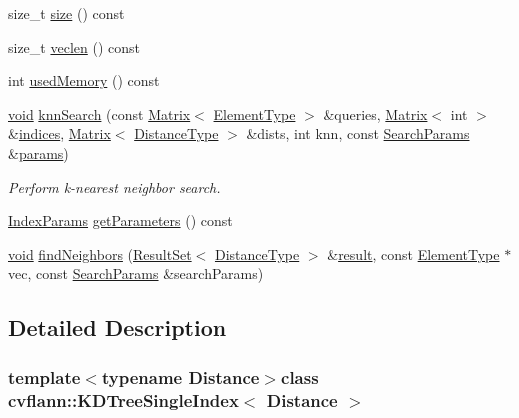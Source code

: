 \begin{DoxyCompactItemize}
size\-\_\-t \hyperlink{classcvflann_1_1KDTreeSingleIndex_af9db9baa7fc203e002f1e0e5c7f4e3de}{size} () const 
\item 
size\-\_\-t \hyperlink{classcvflann_1_1KDTreeSingleIndex_a4f9c5a8847c6b86b715606635669098e}{veclen} () const 
\item 
int \hyperlink{classcvflann_1_1KDTreeSingleIndex_adb37afd1fc827ca1ad640abec4396a75}{used\-Memory} () const 
\item 
\hyperlink{legacy_8hpp_a8bb47f092d473522721002c86c13b94e}{void} \hyperlink{classcvflann_1_1KDTreeSingleIndex_a5f53f54a2b04a25a370cb7f03a5317df}{knn\-Search} (const \hyperlink{classcvflann_1_1Matrix}{Matrix}$<$ \hyperlink{classcvflann_1_1KDTreeSingleIndex_a3b7bf5e05057a76d1b7eee693062784e}{Element\-Type} $>$ \&queries, \hyperlink{classcvflann_1_1Matrix}{Matrix}$<$ int $>$ \&\hyperlink{legacy_8hpp_a3e3b9b48bcbc7f460efbcfe4399ad24a}{indices}, \hyperlink{classcvflann_1_1Matrix}{Matrix}$<$ \hyperlink{classcvflann_1_1KDTreeSingleIndex_ab32f2e8496ef780c2538576b8a330029}{Distance\-Type} $>$ \&dists, int knn, const \hyperlink{structcvflann_1_1SearchParams}{Search\-Params} \&\hyperlink{compat_8hpp_a0480a03ecc41b20cde376602531d9270}{params})
\begin{DoxyCompactList}\small\item\em Perform k-\/nearest neighbor search. \end{DoxyCompactList}\item 
\hyperlink{namespacecvflann_a742b4c7076c21012054af74a9ee48289}{Index\-Params} \hyperlink{classcvflann_1_1KDTreeSingleIndex_aee3e3322dd956e234f17146fc220229a}{get\-Parameters} () const 
\item 
\hyperlink{legacy_8hpp_a8bb47f092d473522721002c86c13b94e}{void} \hyperlink{classcvflann_1_1KDTreeSingleIndex_aedd8818914111a3ef3740ee72c1b8477}{find\-Neighbors} (\hyperlink{classcvflann_1_1ResultSet}{Result\-Set}$<$ \hyperlink{classcvflann_1_1KDTreeSingleIndex_ab32f2e8496ef780c2538576b8a330029}{Distance\-Type} $>$ \&\hyperlink{legacy_8hpp_a0bb77d54f6769867cfdf389897bd8e43}{result}, const \hyperlink{classcvflann_1_1KDTreeSingleIndex_a3b7bf5e05057a76d1b7eee693062784e}{Element\-Type} $\ast$vec, const \hyperlink{structcvflann_1_1SearchParams}{Search\-Params} \&search\-Params)
\end{DoxyCompactItemize}


\subsection{Detailed Description}
\subsubsection*{template$<$typename Distance$>$class cvflann\-::\-K\-D\-Tree\-Single\-Index$<$ Distance $>$}

